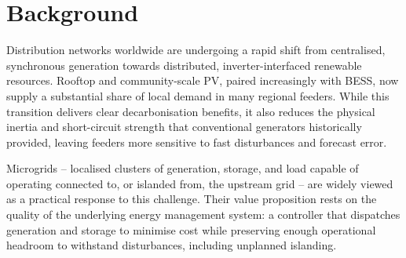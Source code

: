\section{Background}

Distribution networks worldwide are undergoing a rapid shift from centralised, synchronous generation towards distributed, inverter-interfaced renewable resources. Rooftop and community-scale PV, paired increasingly with BESS, now supply a substantial share of local demand in many regional feeders. While this transition delivers clear decarbonisation benefits, it also reduces the physical inertia and short-circuit strength that conventional generators historically provided, leaving feeders more sensitive to fast disturbances and forecast error.

Microgrids -- localised clusters of generation, storage, and load capable of operating connected to, or islanded from, the upstream grid -- are widely viewed as a practical response to this challenge. Their value proposition rests on the quality of the underlying energy management system: a controller that dispatches generation and storage to minimise cost while preserving enough operational headroom to withstand disturbances, including unplanned islanding.
